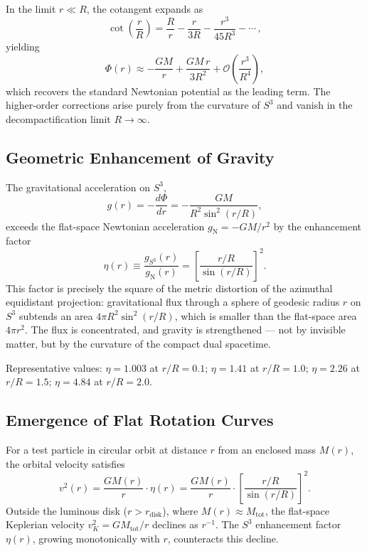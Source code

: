 \documentclass[dvipdfmx,a4paper]{article}
\begin{document}
In the limit $r \ll R$, the cotangent expands as
\[
\cot\!\left(\frac{r}{R}\right) = \frac{R}{r} - \frac{r}{3R} - \frac{r^3}{45R^3} - \cdots\,,
\]
yielding
\[
\Phi(r) \approx -\frac{GM}{r} + \frac{GM\,r}{3R^2} + \mathcal{O}\!\left(\frac{r^3}{R^4}\right),
\]
which recovers the standard Newtonian potential as the leading term. The higher-order corrections arise purely from the curvature of $S^3$ and vanish in the decompactification limit $R \to \infty$.

\subsection{Geometric Enhancement of Gravity}

The gravitational acceleration on $S^3$,
\[
g(r) = -\frac{d\Phi}{dr} = -\frac{GM}{R^2 \sin^2(r/R)},
\]
exceeds the flat-space Newtonian acceleration $g_{\text{N}} = -GM/r^2$ by the enhancement factor
\[
\eta(r) \equiv \frac{g_{S^3}(r)}{g_{\text{N}}(r)} = \left[\frac{r/R}{\sin(r/R)}\right]^2.
\]
This factor is precisely the square of the metric distortion of the azimuthal equidistant projection: gravitational flux through a sphere of geodesic radius $r$ on $S^3$ subtends an area $4\pi R^2 \sin^2(r/R)$, which is smaller than the flat-space area $4\pi r^2$. The flux is concentrated, and gravity is strengthened --- not by invisible matter, but by the curvature of the compact dual spacetime.

Representative values: $\eta = 1.003$ at $r/R = 0.1$; $\eta = 1.41$ at $r/R = 1.0$; $\eta = 2.26$ at $r/R = 1.5$; $\eta = 4.84$ at $r/R = 2.0$.

\subsection{Emergence of Flat Rotation Curves}

For a test particle in circular orbit at distance $r$ from an enclosed mass $M(r)$, the orbital velocity satisfies
\[
v^2(r) = \frac{GM(r)}{r} \cdot \eta(r) = \frac{GM(r)}{r} \cdot \left[\frac{r/R}{\sin(r/R)}\right]^2.
\]
Outside the luminous disk ($r > r_{\text{disk}}$), where $M(r) \approx M_{\text{tot}}$, the flat-space Keplerian velocity $v_K^2 = GM_{\text{tot}}/r$ declines as $r^{-1}$. The $S^3$ enhancement factor $\eta(r)$, growing monotonically with $r$, counteracts this decline.
\end{document}
